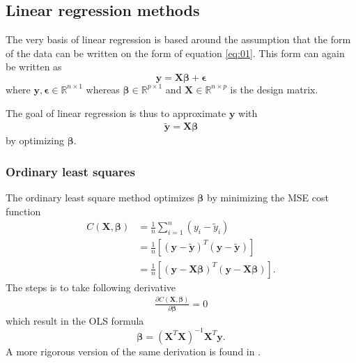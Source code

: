 \documentclass[uio,jmp,amsmath,amssymb,reprint,nofootinbib]{revtex4-1}
\numberwithin{equation}{section}
\newcommand{\lp}{\left(}
\newcommand{\rp}{\right)}
\newcommand{\lsb}{\left[}
\newcommand{\rsb}{\right]}
\begin{document}
\subsection{Linear regression methods}

The very basis of linear regression is based around the assumption that the form of the data can be written on the form of equation \ref{eq:01}. This form can again be written as
\begin{equation}
    \bm{y} = \bm{X}\bm{\beta} + \bm{\epsilon}
\end{equation}
where \(\bm{y}, \bm{\epsilon} \in \mathbb{R}^{n\times 1}\) whereas \(\bm{\beta} \in \mathbb{R}^{p\times 1}\) and \(\bm{X}  \in \mathbb{R}^{n\times p}\) is the design matrix.

The goal of linear regression is thus to approximate \(\bm{y}\) with
\begin{align}\label{eq:10}
    \bm{\tilde{y}} = \bm{X}\bm{\beta}
\end{align}
by optimizing \(\bm{\beta}\). 

\subsubsection{Ordinary least squares}

The ordinary least square method optimizes \(\bm{\beta}\) by minimizing the MSE cost function
\begin{align}
    C(\bm{X, \beta}) &= \frac{1}{n}\sum_{i=1}^n(y_i-\tilde{y}_i)\\
    &= \frac{1}{n}\lsb \lp \bm{y} - \bm{\tilde{y}}\rp^T\lp \bm{y} - \bm{\tilde{y}}\rp\rsb\\
    &= \frac{1}{n}\lsb \lp \bm{y} - \bm{X}\bm{\beta}\rp^T\lp \bm{y} - \bm{X}\bm{\beta}\rp\rsb.
\end{align}
The steps is to take following derivative
\begin{align}
    \frac{\partial C(\bm{X, \beta})}{\partial\bm{\beta}} = 0
\end{align}
which result in the OLS formula
\begin{equation}\label{eq:06}
    \bm{\beta} = (\bm{X}^T\bm{X})^{-1}\bm{X}^T\bm{y}.
\end{equation}
A more rigorous version of the same derivation is found in \cite{MHJ_LinReg}.
\end{document}
